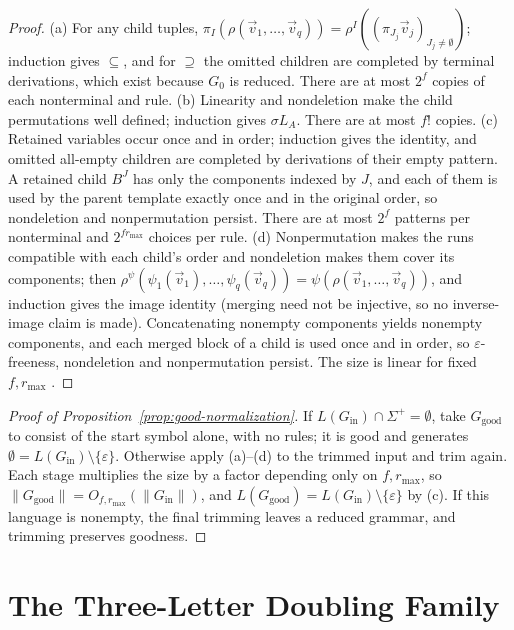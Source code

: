 \documentclass[11pt]{article}
\numberwithin{equation}{section}
\theoremstyle{plain}
\theoremstyle{definition}
\theoremstyle{remark}
\newcommand{\tuple}[1]{\vec{#1}}
\newcommand{\eps}{\varepsilon}
\theoremstyle{plain}
\begin{document}
\begin{proof}
(a) For any child tuples,
$\pi_I(\rho(\tuple v_1,\ldots,\tuple v_q))=\rho^I((\pi_{J_j}\tuple v_j)_{J_j\ne\emptyset})$;
induction gives $\subseteq$, and for $\supseteq$ the omitted children are completed by
terminal derivations, which exist because $G_0$ is reduced.  There are at most $2^f$
copies of each nonterminal and rule.
(b) Linearity and nondeletion make the child permutations well defined; induction gives
$\sigma L_A$.  There are at most $f!$ copies.
(c) Retained variables occur once and in order; induction gives the identity, and
omitted all-empty children are completed by derivations of their empty pattern.  A
retained child $B^J$ has only the components indexed by $J$, and each of them is used by
the parent template exactly once and in the original order, so nondeletion and
nonpermutation persist.  There
are at most $2^f$ patterns per nonterminal and $2^{fr_{\max}}$ choices per rule.
(d) Nonpermutation makes the runs compatible with each child's order and nondeletion
makes them cover its components; then
$\rho^\psi(\psi_1(\tuple v_1),\ldots,\psi_q(\tuple v_q))=\psi(\rho(\tuple v_1,\ldots,\tuple v_q))$,
and induction gives the image identity (merging need not be injective, so no
inverse-image claim is made).  Concatenating nonempty components yields nonempty
components, and each merged block of a child is used once and in order, so
$\eps$-freeness, nondeletion and nonpermutation persist.  The size is linear for fixed $f,r_{\max}$
\cite[Section~2.3, after Example~2]{Yoshinaka2011}.
\end{proof}

\begin{proof}[Proof of Proposition~\ref{prop:good-normalization}]
If $L(G_{\mathrm{in}})\cap\Sigma^+=\emptyset$, take $G_{\mathrm{good}}$ to consist of the
start symbol alone, with no rules; it is good and generates
$\emptyset=L(G_{\mathrm{in}})\setminus\{\eps\}$.  Otherwise apply (a)--(d) to the trimmed
input and trim again.  Each stage multiplies the size by a
factor depending only on $f,r_{\max}$, so
$\|G_{\mathrm{good}}\|=O_{f,r_{\max}}(\|G_{\mathrm{in}}\|)$, and
$L(G_{\mathrm{good}})=L(G_{\mathrm{in}})\setminus\{\eps\}$ by (c).  If this language is
nonempty, the final trimming leaves a reduced grammar, and trimming preserves goodness.
\end{proof}

\section{The Three-Letter Doubling Family}
\label{app:bracketed-family}
\label{app:three-letter-family}
\end{document}
